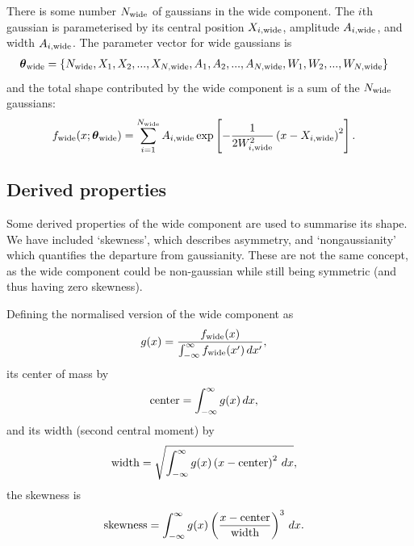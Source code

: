 \documentclass[a4paper, 12pt]{article}
\newcommand{\params}{\boldsymbol{\theta}}
\newcommand{\x}{x}
\begin{document}
There is some number $N_{\rm wide}$ of gaussians in the wide component.
The $i$th gaussian is parameterised
by its central position $X_{i, \rm wide}$,
amplitude $A_{i, \rm wide}$, and width $A_{i, \rm wide}$.
The parameter vector for wide gaussians is
\begin{align}
\params_{\rm wide} &=
  \{N_{\rm wide}, X_1, X_2, ..., X_{N, \rm wide},
    A_1, A_2, ..., A_{N, \rm wide},
    W_1, W_2, ..., W_{N, \rm wide}\}
\end{align}
and the total shape contributed by the
wide component is a sum of the $N_{\rm wide}$ gaussians:
\begin{align}
f_{\rm wide}(\x; \params_{\rm wide}) &=
    \sum_{i=1}^{N_{\rm wide}} A_{i, \rm wide}
 \exp\left[-\frac{1}{2W_{i, \rm wide}^2}\left(x - X_{i, \rm wide}\right)^2\right].
\end{align}

\subsection{Derived properties}
Some derived properties of the wide component are used to summarise its shape.
We have included `skewness', which describes asymmetry, and `nongaussianity'
which quantifies the departure from gaussianity. These are not the same
concept, as the wide component could be non-gaussian while still being symmetric
(and thus having zero skewness).

Defining the normalised version of the wide component as
\begin{align}
g(\x) &= \frac{f_{\rm wide}(\x)}
             {\int_{-\infty}^\infty f_{\rm wide}(\x') \, d\x'},
\end{align}
its center of mass by
\begin{align}
\textnormal{center} &= \int_{-\infty}^\infty g(\x) \, d\x,
\end{align}
and its width (second central moment) by
\begin{align}
\textnormal{width} &= \sqrt{\int_{-\infty}^\infty
                            g(\x) \left(\x - \textnormal{center}\right)^2
                            \, d\x},
\end{align}
the skewness is
\begin{align}
\textnormal{skewness} &= \int_{-\infty}^\infty
                           g(\x) 
                           \left(
                             \frac{x - \textnormal{center}}{\textnormal{width}}
                           \right)^3
                         \, d\x.
\end{align}
\end{document}
